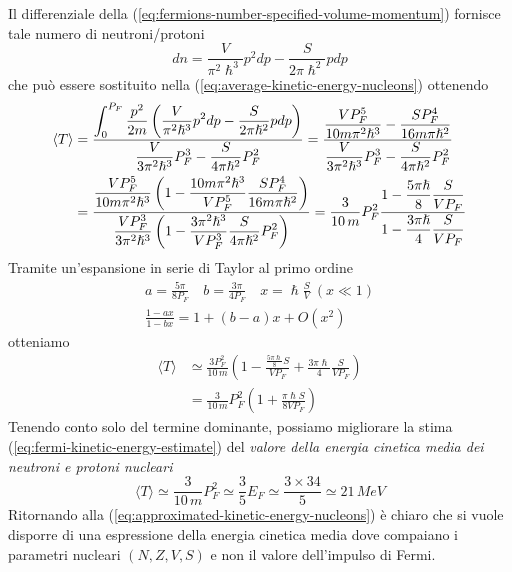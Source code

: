 Il differenziale della (\ref{eq:fermions-number-specified-volume-momentum}) fornisce tale numero di neutroni/protoni
\[
dn = \frac{V}{\pi^{2}\hslash^{3}} p^{2}dp - \frac{S}{2 \pi \hslash^{2}} pdp
\]
che può essere sostituito nella (\ref{eq:average-kinetic-energy-nucleons}) ottenendo
\begin{align*}
    \langle T \rangle &= \fraclarg{\int_{0}^{P_{F}} \frac{p^{2}}{ 2m}\left(\frac{V}{\pi^{2}\hslash^{3}} p^{2}dp - \frac{S}{2 \pi \hslash^{2}} pdp \right)  }{\frac{V}{3\pi^{2}\hslash^{3}} P_{F}^{3} - \frac{S}{4 \pi \hslash^{2}} P_{F}^{2} }
    = \fraclarg{\frac{VP_{F}^{5}}{10m\pi^{2}\hslash^{3}} - \frac{SP_{F}^{4}}{16m\pi \hslash^{2}}}{\frac{V}{3\pi^{2}\hslash^{3}} P_{F}^{3} - \frac{S}{4 \pi \hslash^{2}} P_{F}^{2}}\\
    &= \fraclarg{\frac{VP_{F}^{5}}{10m \pi^{2}\hslash^{3}}\left( 1 - \frac{10m\pi^{2}\hslash^{3}}{VP_{F}^{5}} \frac{SP_F^{4}}{16 m \pi \hslash^{2}} \right)}{\frac{VP_{F}^{3}}{3\pi^{2}\hslash^{3}}\left( 1 - \frac{3\pi^{2}\hslash^{3}}{VP_{F}^{3}} \frac{S}{4 \pi \hslash^{2}}P_{F}^{2} \right)}
	= \frac{3}{10 \,m}P_{F}^{2} \fraclarg{1 - \frac{5\pi \hslash}{8} \frac{S}{VP_{F}}}{1 - \frac{3\pi \hslash}{4} \frac{S}{VP_{F}}}
\end{align*}
Tramite un'espansione in serie di Taylor al primo ordine
\begin{gather*}
    a = \frac{5\pi}{8 P_{F}} \quad b = \frac{3\pi }{4 P_{F}} \quad x = \hslash\frac{S}{V} \ (x \ll 1)\\
    \frac{1-ax}{1-bx} = 1 + (b-a)x + O(x^{2})
\end{gather*}
otteniamo
\begin{align}
    \langle T \rangle &\simeq  \frac{3P_{F}^{2}}{10 \, m} \left( 1 - \frac{\frac{5\pi \hslash}{8}S}{VP_{F}}+ \frac{3\pi \hslash}{4} \frac{S}{V P_{F}} \right) \nonumber\\
     &= \frac{3}{10 \, m}P_{F}^{2} \left( 1 + \frac{\pi\hslash S}{8 V P_{F}} \right)
	\label{eq:approximated-kinetic-energy-nucleons}
\end{align}
Tenendo conto solo del termine dominante, possiamo migliorare la stima (\ref{eq:fermi-kinetic-energy-estimate}) del \emph{valore della energia cinetica media dei neutroni e protoni nucleari}
\[
\langle T \rangle \simeq \frac{3}{10 \, m} P_{F}^{2} \simeq \frac{3}{5}E_{F} \simeq \frac{3 \times 34}{5} \simeq 21 \, MeV
\]
Ritornando alla (\ref{eq:approximated-kinetic-energy-nucleons}) è chiaro che si vuole disporre di una espressione della energia cinetica media dove compaiano i parametri nucleari $(N, Z, V, S)$ e non il valore dell’impulso di Fermi.
